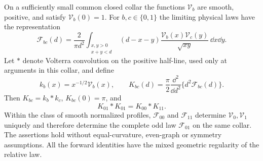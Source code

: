 \begin{theorem}
\label{thm:v9-compatibility}
On a sufficiently small common closed collar the functions
$\mathcal V_b$ are smooth, positive, and satisfy $\mathcal V_b(0)=1$.
For $b,c\in\{0,1\}$ the limiting physical laws have the representation
\begin{equation}\label{eq:v9-energy-integral}
 \mathcal F_{bc}(d)=\frac{2}{\pi d^2}
 \int_{\substack{x,y>0\\x+y<d}}
       (d-x-y)\frac{\mathcal V_b(x)\mathcal V_c(y)}{\sqrt{xy}}
                                               \,\dd x\dd y.
\end{equation}
Let $*$ denote Volterra convolution on the positive half-line, used
only at arguments in this collar, and define
\begin{equation}\label{eq:v9-kernel-def}
 k_b(x)=x^{-1/2}\mathcal V_b(x),\qquad
 K_{bc}(d)=\frac\pi2\frac{\dd^2}{\dd d^2}
                                \{d^2\mathcal F_{bc}(d)\}.
\end{equation}
Then $K_{bc}=k_b*k_c$, $K_{bc}(0)=\pi$, and
\begin{equation}\label{eq:v9-volterra-compatibility}
                  K_{01}*K_{01}=K_{00}*K_{11}.
\end{equation}
Within the class of smooth normalized profiles, $\mathcal F_{00}$
and $\mathcal F_{11}$ determine $\mathcal V_0,\mathcal V_1$
uniquely and therefore determine the complete odd law
$\mathcal F_{01}$ on the same collar. The assertions hold without
equal-curvature, even-graph or symmetry assumptions. All the forward
identities have the mixed geometric regularity of the relative law.
\end{theorem}
